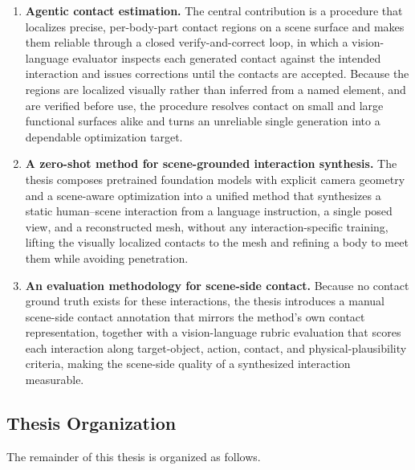 \begin{enumerate}
  \item \textbf{Agentic contact estimation.} The central contribution is a procedure that localizes precise, per-body-part contact regions on a scene surface and makes them reliable through a closed verify-and-correct loop, in which a vision-language evaluator inspects each generated contact against the intended interaction and issues corrections until the contacts are accepted. Because the regions are localized visually rather than inferred from a named element, and are verified before use, the procedure resolves contact on small and large functional surfaces alike and turns an unreliable single generation into a dependable optimization target.

  \item \textbf{A zero-shot method for scene-grounded interaction synthesis.} The thesis composes pretrained foundation models with explicit camera geometry and a scene-aware optimization into a unified method that synthesizes a static human--scene interaction from a language instruction, a single posed view, and a reconstructed mesh, without any interaction-specific training, lifting the visually localized contacts to the mesh and refining a body to meet them while avoiding penetration.

  \item \textbf{An evaluation methodology for scene-side contact.} Because no contact ground truth exists for these interactions, the thesis introduces a manual scene-side contact annotation that mirrors the method's own contact representation, together with a vision-language rubric evaluation that scores each interaction along target-object, action, contact, and physical-plausibility criteria, making the scene-side quality of a synthesized interaction measurable.
\end{enumerate}

\subsection{Thesis Organization}
\label{sec:intro-organization}
 
The remainder of this thesis is organized as follows.
 
